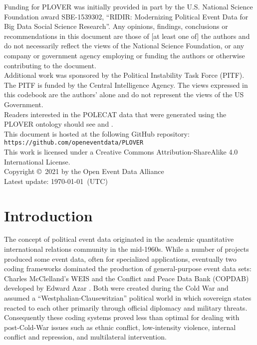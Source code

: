 \documentclass[11pt]{report}
\newcommand{\txt}[1]{\texttt{#1}}
\begin{document}
\noindent Funding for PLOVER was initially provided in part by the U.S. National Science Foundation award SBE-1539302, ``RIDIR: Modernizing Political Event Data for Big Data Social Science Research''. Any opinions, findings, conclusions or recommendations in this document are those of [at least one of] the authors and do not necessarily reflect the views of the National Science Foundation, or any company or government agency employing or funding the authors or otherwise contributing to the document.\\

\noindent Additional work was sponsored by the Political Instability Task Force (PITF). The PITF is funded by the Central Intelligence Agency. The views expressed in this codebook are the authors' alone and do not
represent the views of the US Government.\\

\noindent Readers interested in the POLECAT data that were generated using the PLOVER ontology should see \citet{ScarboroughEtAl2023} and \citet{HaltermanEtAl2023}.\\

\noindent This document is hosted at the following GitHub repository: \txt{\footnotesize https://github.com/openeventdata/PLOVER}\\


\noindent This work is licensed under a Creative Commons Attribution-ShareAlike 4.0 International License.\\

\noindent  Copyright \copyright ~2021 by the Open Event Data Alliance \\

\noindent Latest update: \today~(UTC)


\chapter{Introduction}

The concept of political event data originated in the academic quantitative international relations community in the mid-1960s. While a number of projects produced some event data, often for specialized applications, eventually two coding frameworks dominated the production of general-purpose event data sets: Charles McClelland's WEIS \citep{McClelland67,McClelland76}  and the Conflict and Peace Data Bank (COPDAB) developed by Edward Azar \citep{AzarSloan75, Azar80, Azar82}. Both were created during the Cold War and assumed a ``Westphalian-Clausewitzian'' political world in which sovereign states reacted to each other primarily through official diplomacy
and military threats. Consequently these coding systems proved less than optimal for dealing with post-Cold-War issues such as ethnic conflict, low-intensity violence, internal conflict and repression, and multilateral intervention.
\end{document}
